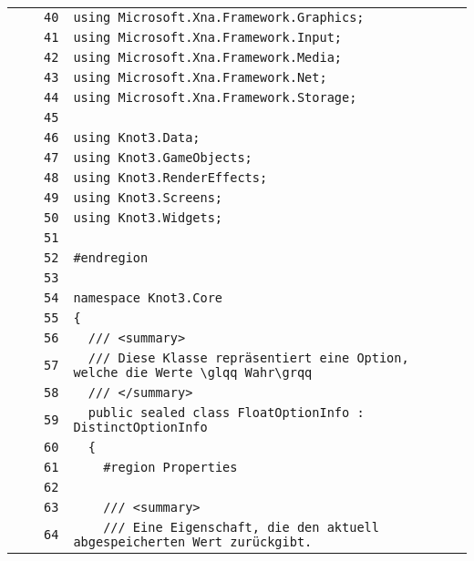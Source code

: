 \documentclass[a4paper,10pt]{article}
\begin{document}
\begin{longtable}[l]{lrrl}
\cellcolor{gray} &  & \verb~40~ & \verb~using Microsoft.Xna.Framework.Graphics;~\\
\cellcolor{gray} &  & \verb~41~ & \verb~using Microsoft.Xna.Framework.Input;~\\
\cellcolor{gray} &  & \verb~42~ & \verb~using Microsoft.Xna.Framework.Media;~\\
\cellcolor{gray} &  & \verb~43~ & \verb~using Microsoft.Xna.Framework.Net;~\\
\cellcolor{gray} &  & \verb~44~ & \verb~using Microsoft.Xna.Framework.Storage;~\\
\cellcolor{gray} &  & \verb~45~ & \verb~~\\
\cellcolor{gray} &  & \verb~46~ & \verb~using Knot3.Data;~\\
\cellcolor{gray} &  & \verb~47~ & \verb~using Knot3.GameObjects;~\\
\cellcolor{gray} &  & \verb~48~ & \verb~using Knot3.RenderEffects;~\\
\cellcolor{gray} &  & \verb~49~ & \verb~using Knot3.Screens;~\\
\cellcolor{gray} &  & \verb~50~ & \verb~using Knot3.Widgets;~\\
\cellcolor{gray} &  & \verb~51~ & \verb~~\\
\cellcolor{gray} &  & \verb~52~ & \verb~#endregion~\\
\cellcolor{gray} &  & \verb~53~ & \verb~~\\
\cellcolor{gray} &  & \verb~54~ & \verb~namespace Knot3.Core~\\
\cellcolor{gray} &  & \verb~55~ & \verb~{~\\
\cellcolor{gray} &  & \verb~56~ & \verb~  /// <summary>~\\
\cellcolor{gray} &  & \verb~57~ & \verb~  /// Diese Klasse repräsentiert eine Option, welche die Werte \glqq Wahr\grqq~\\
\cellcolor{gray} &  & \verb~58~ & \verb~  /// </summary>~\\
\cellcolor{gray} &  & \verb~59~ & \verb~  public sealed class FloatOptionInfo : DistinctOptionInfo~\\
\cellcolor{gray} &  & \verb~60~ & \verb~  {~\\
\cellcolor{gray} &  & \verb~61~ & \verb~    #region Properties~\\
\cellcolor{gray} &  & \verb~62~ & \verb~~\\
\cellcolor{gray} &  & \verb~63~ & \verb~    /// <summary>~\\
\cellcolor{gray} &  & \verb~64~ & \verb~    /// Eine Eigenschaft, die den aktuell abgespeicherten Wert zurückgibt.~\\

\end{longtable}
\end{document}
